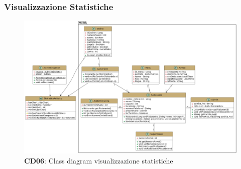     \subsubsection{Visualizzazione Statistiche}
        \begin{figure}[H]
            \centering
            \includegraphics[scale=0.2]{assets/diagrammi/Class diagram di design/gestione statistiche.png}
            \caption*{\textbf{CD06}: Class diagram visualizzazione statistiche}\label{fig:ClassDiagram_ViewStats}
        \end{figure}
